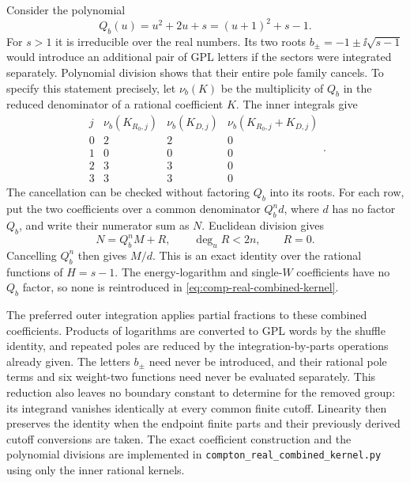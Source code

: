 Consider the polynomial
\begin{equation}
 Q_b(u)=u^2+2u+s=(u+1)^2+s-1.
\end{equation}
For $s>1$ it is irreducible over the real numbers. Its two roots
$b_\pm=-1\pm\ii\sqrt{s-1}$ would introduce an additional pair of GPL
letters if the sectors were integrated separately. Polynomial division
shows that their entire pole family cancels. To specify this statement
precisely, let $\nu_b(K)$ be the multiplicity of $Q_b$ in the reduced
denominator of a rational coefficient $K$. The inner integrals give
\begin{equation}
\begin{array}{c|ccc}
 j&\nu_b(K_{R_0,j})&\nu_b(K_{D,j})&
                 \nu_b(K_{R_0,j}+K_{D,j})\\ \hline
 0&2&2&0\\
 1&0&0&0\\
 2&3&3&0\\
 3&3&3&0
\end{array}.
 \label{eq:comp-real-b-pole-orders}
\end{equation}
The cancellation can be checked without factoring $Q_b$ into its roots.
For each row, put the two coefficients over a common denominator
$Q_b^n d$, where $d$ has no factor $Q_b$, and write their numerator
sum as $N$. Euclidean division gives
\begin{equation}
 N=Q_b^n M+R,\qquad \deg_uR<2n,\qquad R=0.
\end{equation}
Cancelling $Q_b^n$ then gives $M/d$. This is an exact identity over
the rational functions of $H=s-1$. The energy-logarithm and single-$W$
coefficients have no $Q_b$ factor, so none is reintroduced in
\eqref{eq:comp-real-combined-kernel}.

The preferred outer integration applies partial fractions to these
combined coefficients. Products of logarithms are converted to GPL
words by the shuffle identity, and repeated poles are reduced by the
integration-by-parts operations already given. The letters $b_\pm$
need never be introduced, and their rational pole terms and six
weight-two functions need never be evaluated separately. This reduction
also leaves no boundary constant to determine for the removed group:
its integrand vanishes identically at every common finite cutoff.
Linearity then preserves the identity when the endpoint finite parts
and their previously derived cutoff conversions are taken. The exact
coefficient construction and the polynomial divisions are implemented
in \nolinkurl{compton_real_combined_kernel.py} using only the inner
rational kernels.
